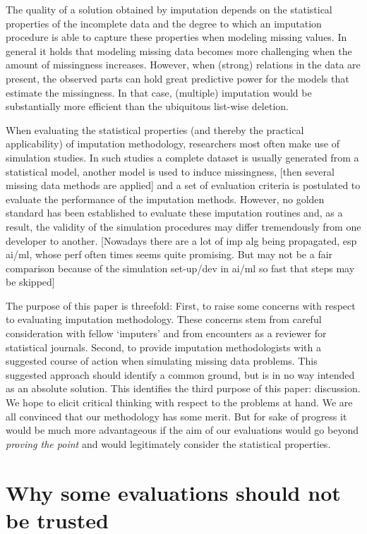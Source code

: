 \documentclass[
]{article}
\begin{document}
The quality of a solution obtained by imputation depends on the
statistical properties of the incomplete data and the degree to which an
imputation procedure is able to capture these properties when modeling
missing values. In general it holds that modeling missing data becomes
more challenging when the amount of missingness increases. However, when
(strong) relations in the data are present, the observed parts can hold
great predictive power for the models that estimate the missingness. In
that case, (multiple) imputation would be substantially more efficient
than the ubiquitous list-wise deletion.

When evaluating the statistical properties (and thereby the practical
applicability) of imputation methodology, researchers most often make
use of simulation studies. In such studies a complete dataset is usually
generated from a statistical model, another model is used to induce
missingness, {[}then several missing data methods are applied{]} and a
set of evaluation criteria is postulated to evaluate the performance of
the imputation methods. However, no golden standard has been established
to evaluate these imputation routines and, as a result, the validity of
the simulation procedures may differ tremendously from one developer to
another. {[}Nowadays there are a lot of imp alg being propagated, esp
ai/ml, whose perf often times seems quite promising. But may not be a
fair comparison because of the simulation set-up/dev in ai/ml so fast
that steps may be skipped{]}

The purpose of this paper is threefold: First, to raise some concerns
with respect to evaluating imputation methodology. These concerns stem
from careful consideration with fellow `imputers' and from encounters as
a reviewer for statistical journals. Second, to provide imputation
methodologists with a suggested course of action when simulating missing
data problems. This suggested approach should identify a common ground,
but is in no way intended as an absolute solution. This identifies the
third purpose of this paper: discussion. We hope to elicit critical
thinking with respect to the problems at hand. We are all convinced that
our methodology has some merit. But for sake of progress it would be
much more advantageous if the aim of our evaluations would go beyond
\emph{proving the point} and would legitimately consider the statistical
properties.

\hypertarget{why-some-evaluations-should-not-be-trusted}{%
\section{Why some evaluations should not be
trusted}\label{why-some-evaluations-should-not-be-trusted}}
\end{document}
